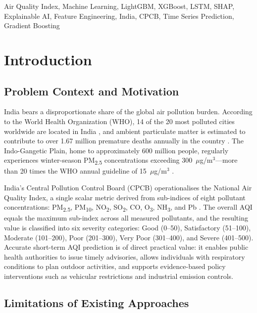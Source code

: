 \documentclass[conference]{IEEEtran}
\begin{document}
\begin{IEEEkeywords}
Air Quality Index, Machine Learning, LightGBM, XGBoost, LSTM, SHAP, Explainable AI, Feature Engineering, India, CPCB, Time Series Prediction, Gradient Boosting
\end{IEEEkeywords}

\section{Introduction}

\subsection{Problem Context and Motivation}

India bears a disproportionate share of the global air pollution burden. According to the World Health Organization (WHO), 14 of the 20 most polluted cities worldwide are located in India \cite{who2021}, and ambient particulate matter is estimated to contribute to over 1.67 million premature deaths annually in the country \cite{balakrishnan2019}. The Indo-Gangetic Plain, home to approximately 600 million people, regularly experiences winter-season PM\textsubscript{2.5} concentrations exceeding 300~$\mu$g/m$^3$---more than 20 times the WHO annual guideline of 15~$\mu$g/m$^3$ \cite{guttikunda2013}.

India's Central Pollution Control Board (CPCB) operationalises the National Air Quality Index, a single scalar metric derived from sub-indices of eight pollutant concentrations: PM\textsubscript{2.5}, PM\textsubscript{10}, NO\textsubscript{2}, SO\textsubscript{2}, CO, O\textsubscript{3}, NH\textsubscript{3}, and Pb \cite{cpcb2014}. The overall AQI equals the maximum sub-index across all measured pollutants, and the resulting value is classified into six severity categories: Good (0--50), Satisfactory (51--100), Moderate (101--200), Poor (201--300), Very Poor (301--400), and Severe (401--500). Accurate short-term AQI prediction is of direct practical value: it enables public health authorities to issue timely advisories, allows individuals with respiratory conditions to plan outdoor activities, and supports evidence-based policy interventions such as vehicular restrictions and industrial emission controls.

\subsection{Limitations of Existing Approaches}
\end{document}
